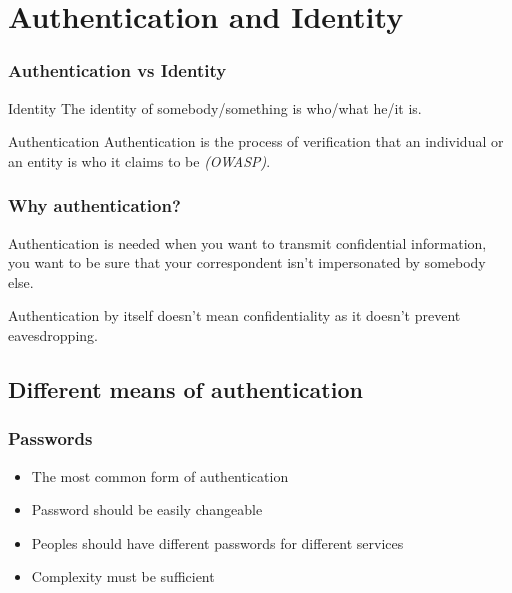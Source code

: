 \section{Authentication and Identity}

\begin{frame}
\frametitle{Authentication vs Identity}
\begin{block}{Identity}
The identity of somebody/something is who/what he/it is.
\end{block}
\begin{block}{Authentication} Authentication is the process of
  verification that an individual or an entity is who it claims to
  be \textit{(OWASP)}.
\end{block}
\end{frame}


\begin{frame}
\frametitle{Why authentication?}

Authentication is needed when you want to transmit confidential
information, you want to be sure that your correspondent isn't
impersonated by somebody else.

Authentication by itself doesn't mean confidentiality as it doesn't
prevent eavesdropping.

\end{frame}


\subsection{Different means of authentication}

\begin{frame}
\frametitle{Passwords}

\begin{itemize}
\item The most common form of authentication
\item Password should be easily changeable
\item Peoples should have different passwords for different services
\item Complexity must be sufficient
\end{itemize}
\end{frame}



